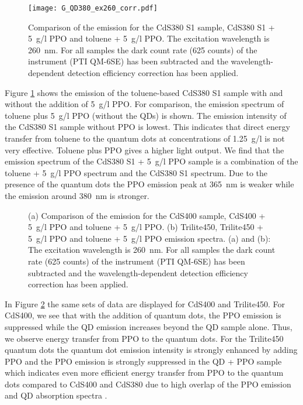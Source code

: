 \documentclass[cits]{JINST}
\begin{document}
\begin{figure}
      \begin{center}
        \texttt{[image: G\_QD380\_ex260\_corr.pdf]}
        \caption[]{Comparison of the emission for the CdS380 S1 sample, CdS380 S1 + 5~g/l PPO and toluene + 5~g/l PPO. The excitation wavelength is 260~nm. For all samples the dark count rate (625 counts) of the instrument (PTI QM-6SE) has been subtracted and the wavelength-dependent detection efficiency correction has been applied. \label{G_QD380_ex260_corr}}
        \end{center}
\end{figure}

Figure \ref{G_QD380_ex260_corr} shows the emission of the toluene-based CdS380 S1 sample with and without the addition of 5~g/l PPO. For comparison, the emission spectrum of toluene plus 5~g/l PPO (without the QDs) is shown. The emission intensity of the CdS380 S1 sample without PPO is lowest. This indicates that direct energy transfer from toluene to the quantum dots at concentrations of 1.25~g/l is not very effective. Toluene plus PPO gives a higher light output. We find that the emission spectrum of the CdS380 S1 + 5~g/l PPO sample is a combination of the toluene + 5~g/l PPO spectrum and the CdS380 S1 spectrum. Due to the presence of the quantum dots the PPO emission peak at 365~nm is weaker while the emission around 380~nm is stronger.  

\begin{figure}
      \begin{center}
\caption[]{(a) Comparison of the emission for the CdS400 sample, CdS400 + 5~g/l PPO and toluene + 5~g/l PPO. (b) Trilite450, Trilite450 + 5~g/l PPO and toluene + 5~g/l PPO emission spectra. (a) and (b): The excitation wavelength is 260~nm. For all samples the dark count rate (625 counts) of the instrument (PTI QM-6SE) has been subtracted and the wavelength-dependent detection efficiency correction has been applied. \label{G_QD400_QD450_ex260_corr}}
        \end{center}
\end{figure}

In Figure \ref{G_QD400_QD450_ex260_corr} the same sets of data are displayed for CdS400 and Trilite450. For CdS400, we see that with the addition of quantum dots, the PPO emission is suppressed while the QD emission increases beyond the QD sample alone. Thus, we observe energy transfer from PPO to the quantum dots. For the Trilite450 quantum dots the quantum dot emission intensity is strongly enhanced by adding PPO and the PPO emission is strongly suppressed in the QD + PPO sample which indicates even more efficient energy transfer from PPO to the quantum dots compared to CdS400 and CdS380 due to high overlap of the PPO emission and QD absorption spectra \cite{foerster}.  
\end{document}
